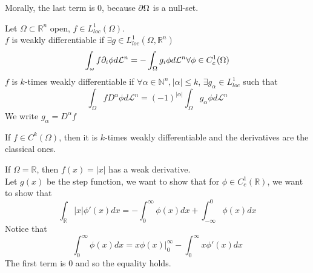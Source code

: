 \documentclass[../main.tex]{subfiles}
\begin{document}
Morally, the last term is 0, because $\partial \Omega$ is a null-set.
\begin{defn}
	Let $\Omega \subset \mathbb{R}^n$ open, $f \in L^{1}_{loc} ( \Omega) $.\\
	$f$ is weakly differentiable if $\exists g \in L^{1}_{loc} ( \Omega, \mathbb{R}^n) $ 
	\[ 
	\int_\omega f \partial_i \phi d \mathcal{L}^{n}= - \int_{ \Omega }^{  }g_i \phi d \mathcal{L}^{n}\forall \phi \in C^{1}_c( \Omega) 
	\]
$f$ is $k$-times weakly differentiable if $\forall \alpha\in \mathbb{N}^{n}, |\alpha| \leq k$, $\exists g_\alpha \in L^{1}_{loc} $ such that
\[ 
\int_{ \Omega }^{  } f D^{\alpha}\phi d \mathcal{L}^{n}= ( -1)^{|\alpha|} \int_{ \Omega }^{  }g_\alpha \phi d \mathcal{L}^{n}
\]
We write $g_\alpha = D^{\alpha} f$ 

\end{defn}
\begin{rmq}
If $f\in C^{k}( \Omega) $, then it is $k$-times weakly differentiable and the derivatives are the classical ones.
\end{rmq}
\begin{exemple}
If $\Omega= \mathbb{R}$, then $f( x) = |x|$ has a weak derivative.\\
Let $g( x) $ be the step function, we want to show that for $\phi \in C^{1}_c ( \mathbb{R}) $, we want to show that
\[ 
\int_{ \mathbb{R} }^{  } |x| \phi'( x) dx = - \int_{ 0 }^{  \infty  } \phi( x) dx + \int_{ - \infty  }^{0  } \phi( x) dx
\]
Notice that 
\[ 
\int_{ 0 }^{ \infty  }\phi( x) dx = x\phi( x) |_0^{ \infty }- \int_{ 0 }^{  \infty  } x\phi'( x) dx
\]
The first term is 0 and so the equality holds.

\end{exemple}
\end{document}
